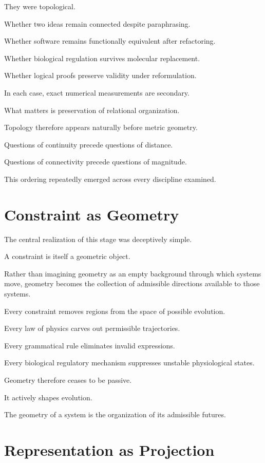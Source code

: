 \documentclass[11pt,oneside]{book}
\numberwithin{equation}{chapter}
\theoremstyle{definition}
\theoremstyle{plain}
\begin{document}
They were topological.

Whether two ideas remain connected despite paraphrasing.

Whether software remains functionally equivalent after refactoring.

Whether biological regulation survives molecular replacement.

Whether logical proofs preserve validity under reformulation.

In each case, exact numerical measurements are secondary.

What matters is preservation of relational organization.

Topology therefore appears naturally before metric geometry.

Questions of continuity precede questions of distance.

Questions of connectivity precede questions of magnitude.

This ordering repeatedly emerged across every discipline examined.

\section{Constraint as Geometry}

The central realization of this stage was deceptively simple.

A constraint is itself a geometric object.

Rather than imagining geometry as an empty background through which systems
move, geometry becomes the collection of admissible directions available to
those systems.

Every constraint removes regions from the space of possible evolution.

Every law of physics carves out permissible trajectories.

Every grammatical rule eliminates invalid expressions.

Every biological regulatory mechanism suppresses unstable physiological
states.

Geometry therefore ceases to be passive.

It actively shapes evolution.

The geometry of a system is the organization of its admissible futures.

\section{Representation as Projection}
\end{document}
